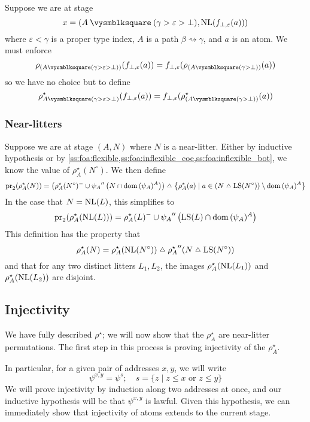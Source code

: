 Suppose we are at stage
\[ x = (A \pcomp (\gamma > \varepsilon > \bot), \NL(f_{\bot,\varepsilon}(a))) \]
where \( \varepsilon < \gamma \) is a proper type index, \( A \) is a path \( \beta \rightsquigarrow \gamma \), and \( a \) is an atom.
We must enforce
\[ \rho_{(A \pcomp (\gamma > \varepsilon > \bot))}(f_{\bot,\varepsilon}(a)) = f_{\bot,\varepsilon}(\rho_{(A \pcomp (\gamma > \bot))}(a)) \]
so we have no choice but to define
\[ \rho^\star_{A \pcomp (\gamma > \varepsilon > \bot)}(f_{\bot,\varepsilon}(a)) = f_{\bot,\varepsilon}(\rho^\star_{(A \pcomp (\gamma > \bot))}(a)) \]

\subsubsection{Near-litters}

Suppose we are at stage \( (A, N) \) where \( N \) is a near-litter.
Either by inductive hypothesis or by \cref{ss:foa:flexible,ss:foa:inflexible_coe,ss:foa:inflexible_bot}, we know the value of \( \rho^\star_A(N^\circ) \).
We then define
\[ \pr_2 (\rho^\star_A(N)) = \left( \rho^\star_A(N^\circ)^- \cup {\psi_A} '' \left(N \cap \dom{(\psi_A)^A}\right) \right) \symmdiff \left\{ \rho^\star_A(a) \mid a \in (N \symmdiff \LS(N^\circ)) \setminus \dom{(\psi_A)^A} \right\} \]
In the case that \( N = \operatorname{NL}(L) \), this simplifies to
\[ \operatorname{pr}_2 (\rho^\star_A(\operatorname{NL}(L))) = \rho^\star_A(L)^- \cup {\psi_A} '' \left(\operatorname{LS}(L) \cap \operatorname{dom}{(\psi_A)^A}\right) \]
This definition has the property that
\[ \rho^\star_A(N) = \rho^\star_A(\NL(N^\circ)) \symmdiff {\rho^\star_A} '' (N \symmdiff \LS(N^\circ)) \]
and that for any two distinct litters \( L_1, L_2 \), the images \( \rho^\star_A(\operatorname{NL}(L_1)) \) and \( \rho^\star_A(\operatorname{NL}(L_2)) \) are disjoint.

\subsection{Injectivity}

We have fully described \( \rho^\star \); we will now show that the \( \rho^\star_A \) are near-litter permutations.
The first step in this process is proving injectivity of the \( \rho^\star_A \).

In particular, for a given pair of addresses \( x, y \), we will write
\[ \psi^{x,y} = \psi^s;\quad s = \{z \mid z \leq x \text{ or } z \leq y\} \]
We will prove injectivity by induction along two addresses at once, and our inductive hypothesis will be that \( \psi^{x,y} \) is lawful.
Given this hypothesis, we can immediately show that injectivity of atoms extends to the current stage.


